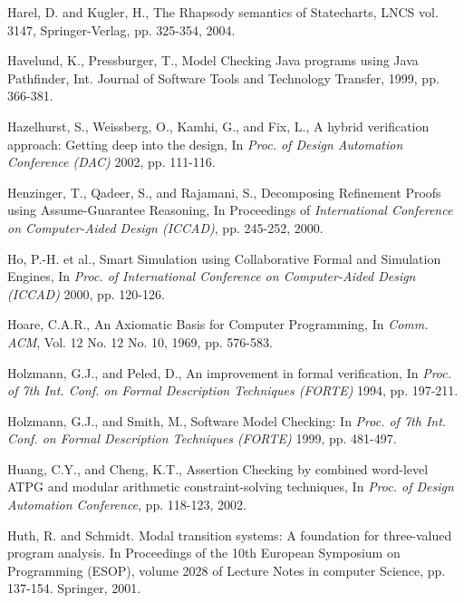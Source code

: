 {\begin{thebibliography}{99}
 Harel, D. and Kugler, H.,
    The Rhapsody semantics of Statecharts, LNCS vol. 3147, Springer-Verlag,
    pp. 325-354, 2004. 

 Havelund, K., Pressburger, T., Model Checking Java 
	programs using Java Pathfinder, Int. Journal of Software Tools 
	and Technology Transfer, 1999, pp. 366-381. 

 Hazelhurst, S., Weissberg, O., Kamhi, G., and Fix, L., 
	A hybrid verification approach: Getting deep into the design, 
	In {\em Proc. of Design Automation Conference (DAC)} 2002, 
	pp. 111-116.

 Henzinger, T., Qadeer, S., and Rajamani, S.,
        Decomposing Refinement Proofs using Assume-Guarantee Reasoning,
        In Proceedings of {\em International Conference on Computer-Aided 
	Design (ICCAD)}, pp. 245-252, 2000.

 Ho, P.-H. et al., Smart Simulation using Collaborative
        Formal and Simulation Engines, In {\em Proc. of International 
	Conference on Computer-Aided Design (ICCAD)} 2000, pp. 120-126.

 Hoare, C.A.R., An Axiomatic Basis for Computer 
	Programming, In {\em Comm. ACM}, Vol. 12 No. 12 No. 10, 1969, 
	pp. 576-583.

 Holzmann, G.J., and Peled, D., An improvement 
	in formal verification, In {\em Proc. of 7th Int. Conf. on Formal 
	Description Techniques (FORTE)} 1994, pp. 197-211.

 Holzmann, G.J., and Smith, M., Software Model Checking: 
	In {\em Proc. 
	of 7th Int. Conf. on Formal Description Techniques (FORTE)}
	1999, pp. 481-497.


 Huang, C.Y., and Cheng, K.T., Assertion Checking by
	combined word-level ATPG and modular arithmetic constraint-solving
	techniques, In {\em Proc. of Design Automation Conference}, 
	pp. 118-123, 2002.


 Huth, R. and Schmidt. Modal transition
    systems: A foundation for three-valued program analysis. In Proceedings
   of the 10th European Symposium on Programming (ESOP), volume 2028 of
    Lecture Notes in computer Science, pp. 137-154. Springer, 2001. 


\end{thebibliography}}
